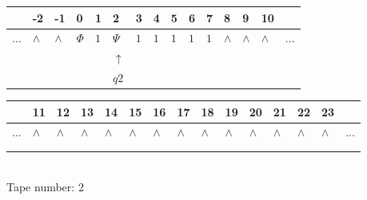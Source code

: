 \documentclass[11pt]{article}
\begin{document}
\begin{table}[H]
\centering
\begin{tabular}{lllllllllllllll}
 & -2 & -1 & 0 & 1 & 2 & 3 & 4 & 5 & 6 & 7 & 8 & 9 & 10 & \\
\hline
$...$ & \multicolumn{1}{|l|}{$\wedge$} & \multicolumn{1}{|l|}{$\wedge$} & \multicolumn{1}{|l|}{$\Phi$} & \multicolumn{1}{|l|}{$1$} & \multicolumn{1}{|l|}{$\Psi$} & \multicolumn{1}{|l|}{$1$} & \multicolumn{1}{|l|}{$1$} & \multicolumn{1}{|l|}{$1$} & \multicolumn{1}{|l|}{$1$} & \multicolumn{1}{|l|}{$1$} & \multicolumn{1}{|l|}{$\wedge$} & \multicolumn{1}{|l|}{$\wedge$} & \multicolumn{1}{|l|}{$\wedge$} & $...$\\
\hline
&  &  &  &  & $\uparrow$ &  &  &  &  &  &  &  &  &  \\
&  &  &  &  & $ q2 $ &  &  &  &  &  &  &  &  &  \\
\end{tabular}
\begin{tabular}{lllllllllllllll}
 & 11 & 12 & 13 & 14 & 15 & 16 & 17 & 18 & 19 & 20 & 21 & 22 & 23 & \\
\hline
$...$ & \multicolumn{1}{|l|}{$\wedge$} & \multicolumn{1}{|l|}{$\wedge$} & \multicolumn{1}{|l|}{$\wedge$} & \multicolumn{1}{|l|}{$\wedge$} & \multicolumn{1}{|l|}{$\wedge$} & \multicolumn{1}{|l|}{$\wedge$} & \multicolumn{1}{|l|}{$\wedge$} & \multicolumn{1}{|l|}{$\wedge$} & \multicolumn{1}{|l|}{$\wedge$} & \multicolumn{1}{|l|}{$\wedge$} & \multicolumn{1}{|l|}{$\wedge$} & \multicolumn{1}{|l|}{$\wedge$} & \multicolumn{1}{|l|}{$\wedge$} & $...$\\
\hline
&  &  &  &  &  &  &  &  &  &  &  &  &  &  \\
&  &  &  &  &  &  &  &  &  &  &  &  &  &  \\
\end{tabular}
\\
Tape number: 2
\noindent\makebox[\linewidth]{\hdashrule{\textwidth}{1pt}{1pt}}\end{table}
\end{document}
